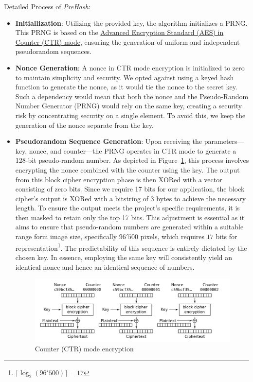 Detailed Process of \textit{PreHash}:
\begin{itemize}
    \item \textbf{Initiallization}: Utilizing the provided key, the algorithm initializes a PRNG. This PRNG is based on the \hyperref[def:AES CTR mode]{Advanced Encryption Standard (AES) in Counter (CTR) mode}, ensuring the generation of uniform and independent pseudorandom sequences.

    \item \textbf{Nonce Generation}: A nonce in CTR mode encryption is initialized to zero to maintain simplicity and security. We opted against using a keyed hash function to generate the nonce, as it would tie the nonce to the secret key. Such a dependency would mean that both the nonce and the Pseudo-Random Number Generator (PRNG) would rely on the same key, creating a security risk by concentrating security on a single element. To avoid this, we keep the generation of the nonce separate from the key.

    \item \textbf{Pseudorandom Sequence Generation}: Upon receiving the parameters—key, nonce, and counter—the PRNG operates in CTR mode to generate a 128-bit pseudo-random number. As depicted in Figure~\ref{ctr encryption}, this process involves encrypting the nonce combined with the counter using the key. The output from this block cipher encryption phase is then XORed with a vector consisting of zero bits. Since we require 17 bits for our application, the block cipher's output is XORed with a bitstring of 3 bytes to achieve the necessary length. To ensure the output meets the project's specific requirements, it is then masked to retain only the top 17 bits. This adjustment is essential as it aims to ensure that pseudo-random numbers are generated within a suitable range form image size, specifically \(96'500\) pixels, which requires \(17\) bits for representation\footnote{\(\lceil \log_2(96'500) \rceil = 17\)}. The predictability of this sequence is entirely dictated by the chosen key. In essence, employing the same key will consistently yield an identical nonce and hence an identical sequence of numbers.

    \begin{figure}[!h]
        \centering
        \includegraphics[width=1\linewidth]{latex-img/CTR_encryption.png}
        \caption{Counter (CTR) mode encryption}
        \label{ctr encryption}
    \end{figure}


\end{itemize}
